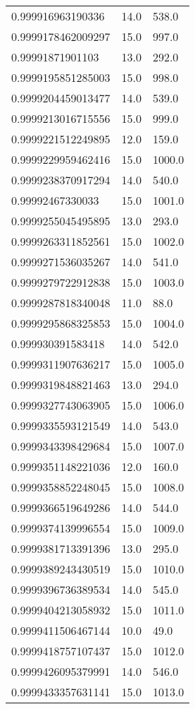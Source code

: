 \begin{center}
\begin{supertabular}[H]{p{0.30\textwidth}p{0.05\textwidth}p{0.05\textwidth}}
0.999916963190336 & 14.0 & 538.0 \\ 
0.9999178462009297 & 15.0 & 997.0 \\ 
0.99991871901103 & 13.0 & 292.0 \\ 
0.9999195851285003 & 15.0 & 998.0 \\ 
0.9999204459013477 & 14.0 & 539.0 \\ 
0.9999213016715556 & 15.0 & 999.0 \\ 
0.9999221512249895 & 12.0 & 159.0 \\ 
0.9999229959462416 & 15.0 & 1000.0 \\ 
0.9999238370917294 & 14.0 & 540.0 \\ 
0.99992467330033 & 15.0 & 1001.0 \\ 
0.9999255045495895 & 13.0 & 293.0 \\ 
0.9999263311852561 & 15.0 & 1002.0 \\ 
0.9999271536035267 & 14.0 & 541.0 \\ 
0.9999279722912838 & 15.0 & 1003.0 \\ 
0.9999287818340048 & 11.0 & 88.0 \\ 
0.9999295868325853 & 15.0 & 1004.0 \\ 
0.999930391583418 & 14.0 & 542.0 \\ 
0.9999311907636217 & 15.0 & 1005.0 \\ 
0.9999319848821463 & 13.0 & 294.0 \\ 
0.9999327743063905 & 15.0 & 1006.0 \\ 
0.9999335593121549 & 14.0 & 543.0 \\ 
0.9999343398429684 & 15.0 & 1007.0 \\ 
0.9999351148221036 & 12.0 & 160.0 \\ 
0.9999358852248045 & 15.0 & 1008.0 \\ 
0.9999366519649286 & 14.0 & 544.0 \\ 
0.9999374139996554 & 15.0 & 1009.0 \\ 
0.9999381713391396 & 13.0 & 295.0 \\ 
0.9999389243430519 & 15.0 & 1010.0 \\ 
0.9999396736389534 & 14.0 & 545.0 \\ 
0.9999404213058932 & 15.0 & 1011.0 \\ 
0.9999411506467144 & 10.0 & 49.0 \\ 
0.9999418757107437 & 15.0 & 1012.0 \\ 
0.9999426095379991 & 14.0 & 546.0 \\ 
0.9999433357631141 & 15.0 & 1013.0 \\ 

\end{supertabular}
\end{center}
